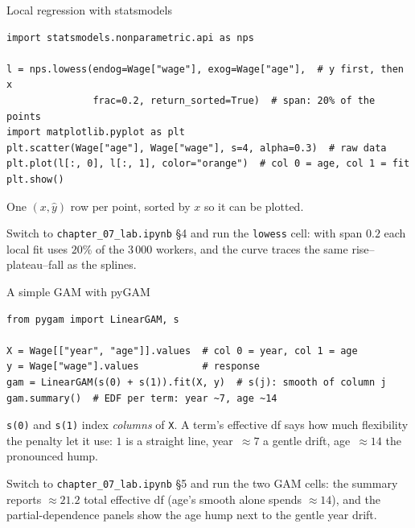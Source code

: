 \documentclass[aspectratio=169,11pt]{beamer}
\begin{document}
\begin{frame}[fragile]{Local regression with statsmodels}
  \begin{lstlisting}
import statsmodels.nonparametric.api as nps

l = nps.lowess(endog=Wage["wage"], exog=Wage["age"],  # y first, then x
               frac=0.2, return_sorted=True)  # span: 20% of the points
import matplotlib.pyplot as plt
plt.scatter(Wage["age"], Wage["wage"], s=4, alpha=0.3)  # raw data
plt.plot(l[:, 0], l[:, 1], color="orange")  # col 0 = age, col 1 = fit
plt.show()
  \end{lstlisting}
  \begin{readme}
    One $(x,\hat y)$ row per point, sorted by $x$ so it can be plotted.
  \end{readme}
  \begin{labnote}
    Switch to \texttt{chapter\_07\_lab.ipynb} \S4 and run the \texttt{lowess} cell: with span $0.2$ each local fit uses $20\%$ of the $3\,000$ workers, and the curve traces the same rise--plateau--fall as the splines.
  \end{labnote}
\end{frame}

\begin{frame}[fragile]{A simple GAM with pyGAM}
  \begin{lstlisting}
from pygam import LinearGAM, s

X = Wage[["year", "age"]].values  # col 0 = year, col 1 = age
y = Wage["wage"].values           # response
gam = LinearGAM(s(0) + s(1)).fit(X, y)  # s(j): smooth of column j
gam.summary()  # EDF per term: year ~7, age ~14
  \end{lstlisting}
  \begin{readme}
    \texttt{s(0)} and \texttt{s(1)} index \emph{columns} of \texttt{X}.
    A term's effective df says how much flexibility the penalty let it
    use: $1$ is a straight line, year~$\approx7$ a gentle drift,
    age~$\approx14$ the pronounced hump.
  \end{readme}
  \begin{labnote}
    Switch to \texttt{chapter\_07\_lab.ipynb} \S5 and run the two GAM cells: the summary reports $\approx21.2$ total effective df (age's smooth alone spends $\approx14$), and the partial-dependence panels show the age hump next to the gentle year drift.
  \end{labnote}
\end{frame}
\end{document}
